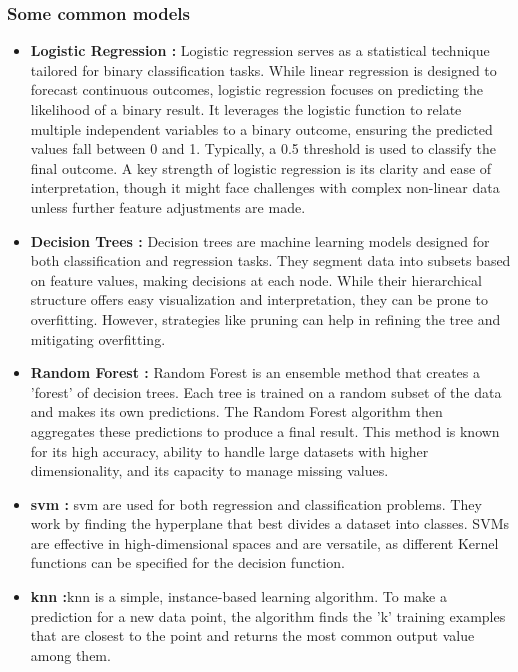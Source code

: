     \subsubsection{Some common models}
    \begin{itemize}
        \item \textbf{Logistic Regression\cite{nick_logistic_2007} : }Logistic regression serves as a statistical technique tailored for binary classification tasks. While linear regression is designed to forecast continuous outcomes, logistic regression focuses on predicting the likelihood of a binary result. It leverages the logistic function to relate multiple independent variables to a binary outcome, ensuring the predicted values fall between 0 and 1. Typically, a 0.5 threshold is used to classify the final outcome. A key strength of logistic regression is its clarity and ease of interpretation, though it might face challenges with complex non-linear data unless further feature adjustments are made.
        
        \item \textbf{Decision Trees\cite{kotsiantis_decision_2013} : }Decision trees are machine learning models designed for both classification and regression tasks. They segment data into subsets based on feature values, making decisions at each node. While their hierarchical structure offers easy visualization and interpretation, they can be prone to overfitting. However, strategies like pruning can help in refining the tree and mitigating overfitting.
        
        \item \textbf{Random Forest\cite{probst_hyperparameters_2019} : }Random Forest is an ensemble method that creates a 'forest' of decision trees. Each tree is trained on a random subset of the data and makes its own predictions. The Random Forest algorithm then aggregates these predictions to produce a final result. This method is known for its high accuracy, ability to handle large datasets with higher dimensionality, and its capacity to manage missing values.
        
        \item \textbf{\acrfull{svm}\cite{wu_analysis_2006} : }\acrshort{svm} are used for both regression and classification problems. They work by finding the hyperplane that best divides a dataset into classes. SVMs are effective in high-dimensional spaces and are versatile, as different Kernel functions can be specified for the decision function.
        
        \item \textbf{\acrfull{knn}\cite{laaksonen_classification_1996} :}\acrshort{knn} is a simple, instance-based learning algorithm. To make a prediction for a new data point, the algorithm finds the 'k' training examples that are closest to the point and returns the most common output value among them.
    \end{itemize}

